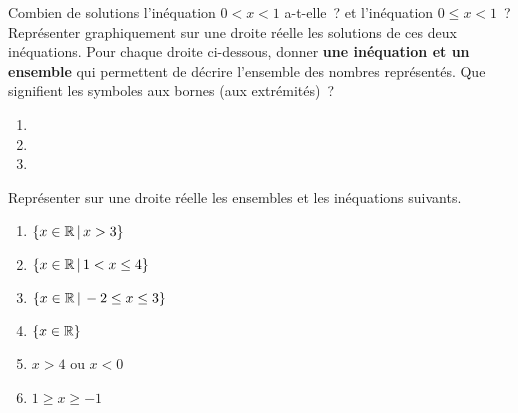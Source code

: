 \documentclass[a4paper,12pt]{article}
\begin{document}
\begin{activite}
	\tcblower
\begin{tasks}
	\task Combien de solutions l'inéquation $0<x<1$ a-t-elle~? et l'inéquation $0\leq x<1$~?
	\task Représenter graphiquement sur une droite réelle les solutions de ces deux inéquations.
	\task Pour chaque droite ci-dessous, donner {\bfseries une inéquation et un ensemble} qui permettent de décrire l'ensemble des nombres représentés. Que signifient les symboles aux bornes (aux extrémités)~? 
	\begin{multicols}{2}
	\begin{enumerate}
	\item 


\item 


	\item 	

	\end{enumerate}
\end{multicols}
	\task Représenter sur une droite réelle les ensembles et les inéquations suivants. 
	\begin{multicols}{3}	
	\begin{enumerate}
		\item $\{x\in \mathbb {\mathbb{R}}\,|\, x>3\}$	
		\item $\{x\in \mathbb {\mathbb{R}}\,|\, 1<x\leq 4\}$	
		\item $\{x\in \mathbb {\mathbb{R}}\,|\, -2\leq x\leq 3\}$	
		\item $\{x\in \mathbb {\mathbb{R}}\}$
		\item $x>4$ ou $x<0$
		\item $1\geq x \geq -1$
	\end{enumerate}
	\end{multicols}
\end{tasks}
\end{activite}
\end{document}
